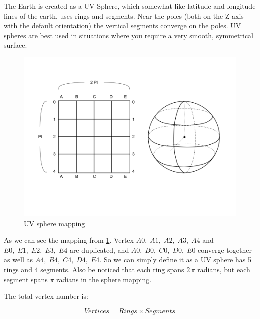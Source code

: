 The Earth is created as a UV Sphere, which somewhat like latitude and longitude lines of the earth, uses rings and segments. Near the poles (both on the Z-axis with the default orientation) the vertical segments converge on the poles. UV spheres are best used in situations where you require a very smooth, symmetrical surface.

\begin{figure}[H]
\caption[uv-sphere-mapping]{UV sphere mapping}
\label{fig:uv-sphere-mapping}
\centering
\includegraphics[width=\linewidth]{Figures/uv-sphere-mapping.png}
\decoRule
\end{figure}

As we can see the mapping from \ref{fig:uv-sphere-mapping}. Vertex $A0,\;A1,\;A2,\;A3,\;A4$ and $E0,\;E1,\;E2,\;E3,\;E4$ are duplicated, and $A0,\;B0,\;C0,\;D0,\;E0$ converge together as well as $A4,\;B4,\;C4,\;D4,\;E4$. So we can simply define it as a UV sphere has 5 rings and 4 segments. Also be noticed that each ring spans $2\,\pi$ radians, but each segment spans $\pi$ radians in the sphere mapping.

The total vertex number is:

\begin{equation}
\label{equ:uv-sphere-vertices}
Vertices = Rings \times Segments
\end{equation}

